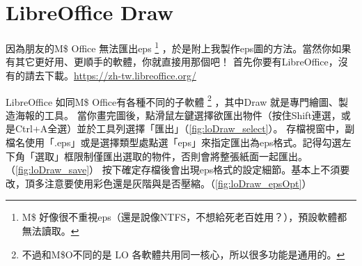 \documentclass[class=NCU_thesis, crop=false]{standalone}
\begin{document}
\chapter{LibreOffice Draw}
\label{sec:a_loDraw}
因為朋友的M\$ Office 無法匯出eps
\footnote{M\$ 好像很不重視eps（還是說像NTFS，不想給死老百姓用？），預設軟體都無法讀取。}
，於是附上我製作eps圖的方法。當然你如果有其它更好用、更順手的軟體，你就直接用那個吧！
首先你要有LibreOffice，沒有的請去下載。\url{https://zh-tw.libreoffice.org/}

LibreOffice 如同M\$ Office有各種不同的子軟體
\footnote{不過和M\$O不同的是 LO 各軟體共用同一核心，所以很多功能是通用的。}
，其中Draw 就是專門繪圖、製造海報的工具。
當你畫完圖後，點滑鼠左鍵選擇欲匯出物件（按住Shift連選，或是Ctrl+A全選）並於工具列選擇「匯出」（\cref{fig:loDraw_select}）。
存檔視窗中，副檔名使用「.eps」或是選擇類型處點選「eps」來指定匯出為eps格式。記得勾選左下角「選取」框限制僅匯出選取的物件，否則會將整張紙面一起匯出。（\cref{fig:loDraw_save}）
按下確定存檔後會出現eps格式的設定細節。基本上不須要改，頂多注意要使用彩色還是灰階與是否壓縮。（\cref{fig:loDraw_epsOpt}）
\end{document}
